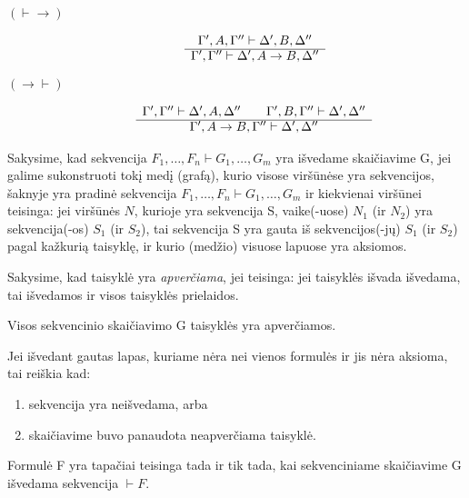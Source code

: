 \begin{defn}
\begin{description}
\[\begin{array}{c}
      \end{array}
      \]
    \item[$(\vdash \to)$] 
      \[
      \begin{array}{c}
        \Gamma',A,\Gamma'' \vdash \Delta',B,\Delta'' \\
        \cline{1-1}
        \Gamma',\Gamma'' \vdash \Delta',A \to B,\Delta''
      \end{array}
      \]
    \item[$(\to \vdash)$] 
      \[
      \begin{array}{c}
        \Gamma',\Gamma'' \vdash \Delta',A,\Delta'' \qquad %
        \Gamma',B,\Gamma'' \vdash \Delta',\Delta'' \\
        \cline{1-1}
        \Gamma',A \to B,\Gamma'' \vdash \Delta',\Delta''
      \end{array}
      \]
  \end{description}
\end{defn}

Sakysime, kad sekvencija $F_{1},\dots,F_{n} \vdash G_{1},\dots,G_{m}$ yra
išvedame skaičiavime G, jei galime sukonstruoti tokį medį (grafą),
kurio visose viršūnėse yra sekvencijos, šaknyje yra pradinė sekvencija
$F_{1},\dots,F_{n} \vdash G_{1},\dots,G_{m}$ ir kiekvienai viršūnei 
teisinga: jei viršūnės $N$, kurioje 
yra sekvencija S, vaike(-uose) $N_{1}$ (ir $N_{2}$) yra sekvencija(-os)
$S_{1}$ (ir $S_{2}$), tai sekvencija S yra gauta iš sekvencijos(-jų)
$S_{1}$ (ir $S_{2}$) pagal kažkurią taisyklę, ir kurio (medžio)
visuose lapuose yra aksiomos.

Sakysime, kad taisyklė yra \emph{apverčiama}, jei teisinga: jei taisyklės
išvada išvedama, tai išvedamos ir visos taisyklės prielaidos.

Visos sekvencinio skaičiavimo G taisyklės yra apverčiamos.

Jei išvedant gautas lapas, kuriame nėra nei vienos formulės ir jis nėra
aksioma, tai reiškia kad:
\begin{enumerate}
  \item sekvencija yra neišvedama, arba
  \item skaičiavime buvo panaudota neapverčiama taisyklė.
\end{enumerate}

\begin{prop}
  Formulė F yra tapačiai teisinga tada ir tik tada, kai sekvenciniame
  skaičiavime G išvedama sekvencija $\vdash F$.
\end{prop}
